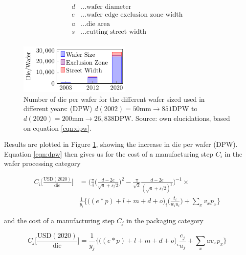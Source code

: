 \documentclass[10pt]{article}
\begin{document}
\begin{align*}
    d &\dots \text{wafer diameter} \\
    e &\dots \text{wafer edge exclusion zone width} \\
    a &\dots \text{die area} \\
    s &\dots \text{cutting street width} \\
\end{align*}

\begin{figure}[h!]
    \centering
    \includegraphics[width=5.5cm]{./figures/die-per-wafer.pdf}
    \caption{Number of die per wafer for the different wafer sized used in different years: (DPW) $d(2002)=50$mm$\rightarrow851$DPW to $d(2020)=200$mm$\rightarrow26,838$DPW. Source: own elucidations, based on equation \cref{eqn:dpw}.}
    \label{fig:dpw}
\end{figure}

Results are plotted in Figure \cref{fig:dpw}, showing the increase in die per wafer (DPW). Equation \cref{eqn:dpw} then gives us for the cost of a manufacturing step $C_i$ in the wafer processing category

\begin{equation}
\label{eqn:cost_wafer_full}
\begin{split}
    C_i \bigg[ \frac{ \text{USD}(2020) }{ \text{die} } \bigg] &= \bigg (  \frac{\pi}{4}  \bigg ( \frac{d-2e}{\sqrt{a}+s/2} \bigg ) ^2 - \frac{\pi}{\sqrt{2}}\frac{d-2e}{(\sqrt{a}+s/2)^2} \bigg )^{-1} \times \\
    &  \frac{1}{y_i}  \bigg\{ \bigg((e*p) + l + m + d +o \bigg)_i \bigg( \frac{t_i}{w_i u_i} \bigg) + \sum_{x} v_x p_x \bigg\}
\end{split}
\end{equation}

and the cost of a manufacturing step $C_j$ in the packaging category

\begin{equation}
\label{eqn:cost_die}
    C_j \bigg[ \frac{ \text{USD}(2020) }{ \text{die} } \bigg] = \frac{1}{y_j}  \bigg\{ \bigg((e*p) + l + m + d + o \bigg)_i  \frac{c_j}{u_j} + \sum_{x} a v_x p_x \bigg\}
\end{equation}
\end{document}
